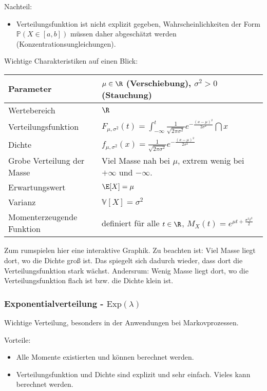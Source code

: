 {Nachteil:}
\begin{itemize}
	\item Verteilungsfunktion ist nicht explizit gegeben, Wahrscheinlichkeiten der Form $\mathbb P(X\in [a,b])$ m\"ussen daher abgesch\"atzt werden (Konzentrationsungleichungen).
\end{itemize}

Wichtige Charakteristiken auf einen Blick:
\begin{center}
\begin{tabular}[h]{|l|l|}
\hline
Parameter& $\mu\in \R$ (Verschiebung), $\sigma^2>0$ (Stauchung)\\
\hline
Wertebereich & $\R$\\
\hline
Verteilungsfunktion & $F_{\mu,\sigma^2}(t)=\int_{-\infty}^t \frac{1}{\sqrt{2\pi \sigma^2}} e^{-\frac{(x-\mu)^2}{2 \sigma^2}} \dint x$ \\
\hline
Dichte & $f_{\mu,\sigma^2}(x)=\frac{1}{\sqrt{2\pi \sigma^2}} e^{-\frac{(x-\mu)^2}{2\sigma^2}}$\\
\hline
Grobe Verteilung der Masse & Viel Masse nah bei $\mu$, extrem wenig bei $+\infty$ und $-\infty$.\\
\hline
Erwartungswert& $\E[X]=\mu$ \\
\hline
Varianz & $\mathbb V[X]=\sigma^2$\\
\hline
Momenterzeugende Funktion& definiert f\"ur alle $t\in\R$, $M_X(t)=e^{\mu t +\frac{\sigma^2 t^2}{2}}$\\
\hline
\end{tabular}

\end{center}
Zum rumspielen hier eine interaktive Graphik. Zu beachten ist: Viel Masse liegt dort, wo die Dichte gro\ss{} ist. Das spiegelt sich dadurch wieder, dass dort die Verteilungsfunktion stark w\"achst. Andersrum: Wenig Masse liegt dort, wo die Verteilungsfunktion flach ist bzw. die Dichte klein ist. 



\subsubsection*{Exponentialverteilung - $\text{Exp}(\lambda)$}

Wichtige Verteilung, besonders in der Anwendungen bei Markovprozessen.\smallskip

{Vorteile:} 
\begin{itemize}
\item Alle Momente existierten und k\"onnen berechnet werden.
\item Verteilungsfunktion und Dichte sind explizit und sehr einfach. Vieles kann berechnet werden.
\end{itemize}

